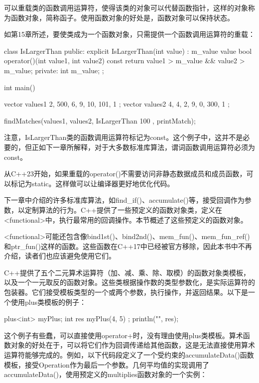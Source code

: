 
可以重载类的函数调用运算符，使得该类的对象可以代替函数指针，这样的对象称为函数对象，简称函子。使用函数对象的好处是，函数对象可以保持状态。


如第15章所述，要使类成为一个函数对象，只需提供一个函数调用运算符的重载：

\begin{cpp}
class IsLargerThan
{
    public:
        explicit IsLargerThan(int value) : m_value { value } {}
        bool operator()(int value1, int value2) const {
            return value1 > m_value && value2 > m_value;
        }
    private:
        int m_value;
};

int main()
{
    vector values1 { 2, 500, 6, 9, 10, 101, 1 };
    vector values2 { 4, 4, 2, 9, 0, 300, 1 };

    findMatches(values1, values2, IsLargerThan { 100 }, printMatch);
}
\end{cpp}

注意，IsLargerThan类的函数调用运算符标记为const。这个例子中，这并不是必要的，但正如下一章所解释，对于大多数标准库算法，谓词函数调用运算符必须为const。

从C++23开始，如果重载的operator()不需要访问非静态数据成员和成员函数，可以标记为static。这样做可以让编译器更好地优化代码。



下一章中介绍的许多标准库算法，如find\_if()、accumulate()等，接受回调作为参数，以定制算法的行为。C++提供了一些预定义的函数对象类，定义在<functional>中，执行最常用的回调操作。本节概述了这些预定义的函数对象。

<functional>可能还包含像bind1st()、bind2nd()、mem\_fun()、mem\_fun\_ref()和ptr\_fun()这样的函数。这些函数在C++17中已经被官方移除，因此本书中不再介绍，读者们也应该避免使用它们。


C++提供了五个二元算术运算符（加、减、乘、除、取模）的函数对象类模板，以及一个一元取反的函数对象。这些类根据操作数的类型参数化，是实际运算符的包装器。它们接受模板类型的一个或两个参数，执行操作，并返回结果。以下是一个使用plus类模板的例子：

\begin{cpp}
plus<int> myPlus;
int res { myPlus(4, 5) };
println("{}", res);
\end{cpp}

这个例子有些蠢，可以直接使用operator+时，没有理由使用plus类模板。算术函数对象的好处在于，可以将它们作为回调传递给其他函数，这是无法直接使用算术运算符能够完成的。例如，以下代码段定义了一个受约束的accumulateData()函数模板，接受Operation作为最后一个参数。几何平均值的实现调用了accumulateData()，使用预定义的multiplies函数对象的一个实例：

